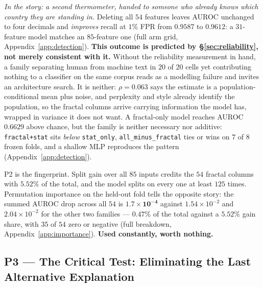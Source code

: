 \documentclass{article}
\newcommand{\arm}[1]{\texttt{#1}}
\begin{document}
\emph{In the story: a second thermometer, handed to someone who already knows which
country they are standing in.} Deleting all $54$ features leaves AUROC unchanged to four decimals
and \emph{improves} recall at $1\%$ FPR from $0.9587$ to $0.9612$: a
$31$-feature model matches an $85$-feature one (full arm grid,
Appendix~\ref{app:detection}). \textbf{This outcome is predicted by
\S\ref{sec:reliability}, not merely consistent with it.} Without the
reliability measurement in hand, a family separating human from machine text
in $20$ of $20$ cells yet contributing nothing to a classifier on the same
corpus reads as a modelling failure and invites an architecture search. It is
neither: $\rho=0.063$ says the estimate is a population-conditional mean plus
noise, and perplexity and style already identify the population, so the
fractal columns arrive carrying information the model has, wrapped in
variance it does not want. A fractal-only model reaches AUROC $0.6629$ above
chance, but the family is neither necessary nor additive: \arm{fractal+stat}
sits \emph{below} \arm{stat\_only}, \arm{all\_minus\_fractal} ties or wins on
$7$ of $8$ frozen folds, and a shallow MLP reproduces the pattern
(Appendix~\ref{app:detection}).

P2 is the fingerprint. Split gain over all $85$ inputs credits the $54$
fractal columns with $5.52\%$ of the total, and the model splits on every one
at least $125$ times. Permutation importance on the held-out fold tells the
opposite story: the summed AUROC drop across all $54$ is
$\mathbf{1.7\times10^{-4}}$ against $1.54\times10^{-2}$ and $2.04\times10^{-2}$
for the other two families --- $0.47\%$ of the total against a $5.52\%$ gain
share, with $35$ of $54$ zero or negative (full breakdown,
Appendix~\ref{app:importance}). \textbf{Used constantly, worth nothing.}

\subsection{P3 --- The Critical Test: Eliminating the Last Alternative Explanation}
\label{sec:withinpop}
\end{document}
